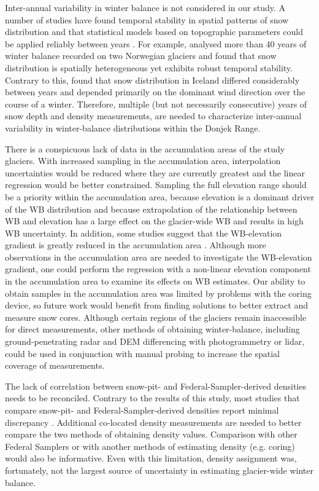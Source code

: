 \documentclass{sfuthesis}
\begin{document}
{Inter-annual variability in winter balance is not considered in our study. A number of studies have found temporal stability in spatial patterns of snow distribution and that statistical models based on topographic parameters could be applied reliably between years \citep[e.g.][]{Grunewald2013}. For example, \cite{Walmsley2015} analysed more than 40 years of winter balance recorded on two Norwegian glaciers and found that snow distribution is spatially heterogeneous yet exhibits robust temporal stability. Contrary to this, \cite{Crochet2007} found that snow distribution in Iceland differed considerably between years and depended primarily on the dominant wind direction over the course of a winter. Therefore, multiple (but not necessarily consecutive) years of snow depth and density measurements, are needed to characterize inter-annual variability in winter-balance distributions within the Donjek Range.

There is a conspicuous lack of data in the accumulation areas of the study glaciers. With increased sampling in the accumulation area, interpolation uncertainties would be reduced where they are currently greatest and the linear regression would be better constrained. Sampling the full elevation range should be a priority within the accumulation area, because elevation is a dominant driver of the WB distribution and because extrapolation of the relationship between WB and elevation has a large effect on the glacier-wide WB and results in high WB uncertainty. In addition, some studies suggest that the WB-elevation gradient is greatly reduced in the accumulation area \citep[e.g.][]{Winther1998}. Although more observations in the accumulation area are needed to investigate the WB-elevation gradient, one could perform the regression with a non-linear elevation component in the accumulation area to examine its effects on WB estimates. Our ability to obtain samples in the accumulation area was limited by problems with the coring device, so future work would benefit from finding solutions to better extract and measure snow cores. Although certain regions of the glaciers remain inaccessible for direct measurements, other methods of obtaining winter-balance, including ground-penetrating radar and DEM differencing with photogrammetry or lidar, could be used in conjunction with manual probing to increase the spatial coverage of measurements.

The lack of correlation between snow-pit- and Federal-Sampler-derived densities needs to be reconciled. Contrary to the results of this study, most studies that compare snow-pit- and Federal-Sampler-derived densities report minimal discrepancy \citep[e.g.][and sources within]{Dixon2012}. Additional co-located density measurements are needed to better compare the two methods of obtaining density values. Comparison with other Federal Samplers or with another methods of estimating density (e.g. coring) would also be informative. Even with this limitation, density assignment was, fortunately, not the largest source of uncertainty in estimating glacier-wide winter balance. 

}
\end{document}
